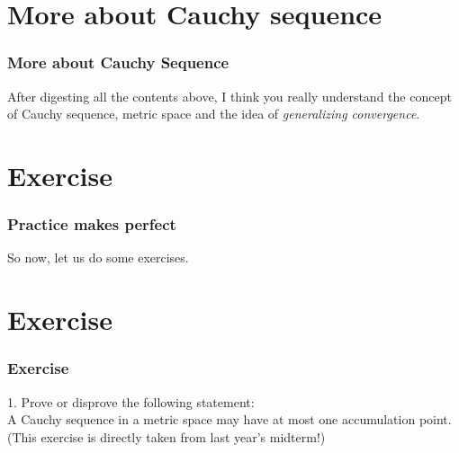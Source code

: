 \documentclass[12pt, t]{beamer}
\renewcommand{\emph}[1]{{\color{Turquoise3}\textsl{#1}}}
\begin{document}
\section{More about Cauchy sequence}
\begin{frame}
    \frametitle{More about Cauchy Sequence}
    After digesting all the contents above, I think you really understand the concept of Cauchy sequence, metric space and the idea of
    \emph{generalizing convergence}.\\
    \vspace{1em}

\end{frame}

\section{Exercise}
\begin{frame}
    \frametitle{Practice makes perfect}
    \vspace{7em}
    \begin{center}

        \Large So now, let us do some exercises.
    \end{center}
\end{frame}

\section{Exercise}
\begin{frame}
    \frametitle{Exercise}
    1. Prove or disprove the following statement:\\
    \hspace{1em} A Cauchy sequence in a metric space may have at most one accumulation point.\\
    (This exercise is directly taken from last year's midterm!)
\end{frame}
\end{document}
